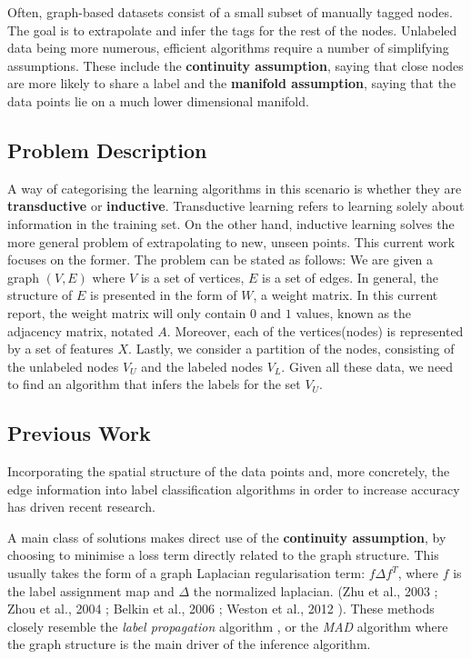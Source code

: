 \documentclass[10pt,a4]{article}
\begin{document}
    Often, graph-based datasets consist of a small subset of manually 
    tagged nodes. The goal is to extrapolate and infer the tags for the rest of 
    the nodes. 
    Unlabeled data being more numerous, efficient algorithms require a number of 
    simplifying assumptions. These include 
    the  \textbf{continuity assumption}, saying that close nodes are more likely 
    to share  a label  and the \textbf{manifold assumption}, saying that the data 
    points lie on a much lower dimensional manifold. \cite{chapelle2009semi} 
    
    \subsection{Problem Description}

    A way of categorising the learning algorithms in this scenario is 
    whether they are \textbf{transductive} or \textbf{inductive}. Transductive 
    learning refers to learning solely about information in the training set. On 
    the other hand, inductive learning solves the more general problem of 
    extrapolating to new, unseen points. This current work 
    focuses on the former. The problem can be stated as follows: 
    We are given a graph $(V, E)$ where $V$ is a set of vertices, $E$ is a set of 
    edges. In general, the structure of $E$ is presented in the form of $W$, 
    a weight matrix. In this current report, the weight matrix will only contain
    $0$ and $1$ values, known as the adjacency matrix, notated $A$. Moreover, each of 
    the vertices(nodes) is represented by a set of features $X$. Lastly, we consider 
    a partition of the nodes, consisting of the unlabeled nodes $V_U$ and the 
    labeled nodes $V_L$. Given all these data, we need to find an algorithm that 
    infers the labels for the set $V_U$.
    
    \subsection{Previous Work}

    Incorporating the spatial structure of the data points and, more concretely,
    the edge information into label classification algorithms in order to increase  
    accuracy has driven recent research. 
    
    A main class of solutions makes direct use of the \textbf{continuity assumption}, 
    by choosing to minimise a loss term directly related to the graph structure. 
    This usually takes the form of a graph Laplacian regularisation term:
    $f \Delta f^T$, where $f$ is the label assignment map and $\Delta$ the
    normalized laplacian. (Zhu et al.,
    2003 \cite{zhu2003semi}; Zhou et al., 2004 \cite{zhou2004learning}; 
    Belkin et al., 2006 \cite{belkin2006manifold}; Weston et al., 2012 
    \cite{weston2012deep}). These methods closely resemble the \emph{label propagation} 
    algorithm \cite{zhu2002learning}, or the \emph{MAD} \cite{talukdar2009new} algorithm
    where the graph structure is the main driver of the inference algorithm.
    
\end{document}
